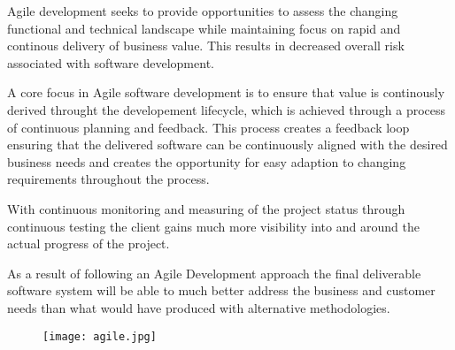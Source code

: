 Agile development seeks to provide opportunities to assess the changing functional and technical landscape while maintaining focus on rapid and continous delivery of business value. This results in decreased overall risk associated with software development.

A core focus in Agile software development is to ensure that value is continously derived throught the developement lifecycle, which is achieved through a process of continuous planning and feedback. This process creates a feedback loop ensuring that the delivered software can be continuously aligned with the desired business needs and creates the opportunity for easy adaption to changing requirements throughout the process.

With continuous monitoring and measuring of the project status through continuous testing the client gains much more visibility into and around the actual progress of the project.

As a result of following an Agile Development approach the final deliverable software system will be able to much better address the business and customer needs than what would have produced with alternative methodologies.

\begin{figure}[t]
  \centering
  \texttt{[image: agile.jpg]}
\end{figure}
